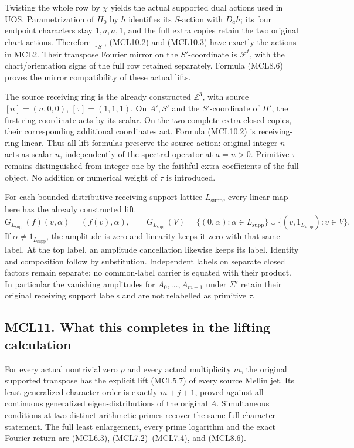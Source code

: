 Twisting the whole row by \(\chi\) yields the actual supported dual
actions used in UOS. Parametrization of \(H_0\) by \(h\) identifies its
\(S\)-action with \(D_a h\); its four endpoint characters stay
\(1,a,a,1\), and the full extra copies retain the two original chart
actions. Therefore \(\jmath_S\), (MCL10.2) and (MCL10.3) have exactly
the actions in MCL2. Their transpose Fourier mirror on the
\(S'\)-coordinate is \(\mathcal F^t\), with the chart/orientation signs
of the full row retained separately. Formula (MCL8.6) proves the mirror
compatibility of these actual lifts.

The source receiving ring is the already constructed \(\mathbb Z^3\),
with source \([n]=(n,0,0)\), \([\tau]=(1,1,1)\). On \(A',S'\) and the
\(S'\)-coordinate of \(H'\), the first ring coordinate acts by its
scalar. On the two complete extra closed copies, their corresponding
additional coordinates act. Formula (MCL10.2) is receiving-ring linear.
Thus all lift formulas preserve the source action: original integer
\(n\) acts as scalar \(n\), independently of the spectral operator at
\(a=n>0\). Primitive \(\tau\) remains distinguished from integer one by
the faithful extra coefficients of the full object. No addition or
numerical weight of \(\tau\) is introduced.

For each bounded distributive receiving support lattice
\(L_{\mathrm{supp}}\), every linear map here has the already constructed
lift \[
 G_{L_{\mathrm{supp}}}(f)(v,\alpha)=(f(v),\alpha),\qquad
 G_{L_{\mathrm{supp}}}(V)
 =\{(0,\alpha):\alpha\in L_{\mathrm{supp}}\}
   \cup\{(v,1_{L_{\mathrm{supp}}}):v\in V\}.
 \tag{MCL10.4}
\] If \(\alpha\ne1_{L_{\mathrm{supp}}}\), the amplitude is zero and
linearity keeps it zero with that same label. At the top label, an
amplitude cancellation likewise keeps its label. Identity and
composition follow by substitution. Independent labels on separate
closed factors remain separate; no common-label carrier is equated with
their product. In particular the vanishing amplitudes for
\(A_0,\ldots,A_{m-1}\) under \(\Sigma'\) retain their original receiving
support labels and are not relabelled as primitive \(\tau\).

\subsection{MCL11. What this completes in the lifting
calculation}\label{mcl11.-what-this-completes-in-the-lifting-calculation}

For every actual nontrivial zero \(\rho\) and every actual multiplicity
\(m\), the original supported transpose has the explicit lift (MCL5.7)
of every source Mellin jet. Its least generalized-character order is
exactly \(m+j+1\), proved against all continuous generalized
eigen-distributions of the original \(A\). Simultaneous conditions at
two distinct arithmetic primes recover the same full-character
statement. The full least enlargement, every prime logarithm and the
exact Fourier return are (MCL6.3), (MCL7.2)--(MCL7.4), and (MCL8.6).

